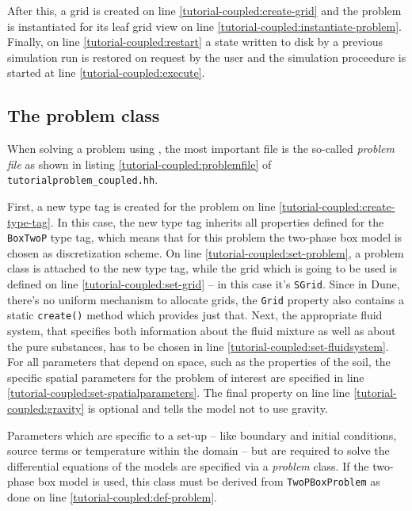 After this, a grid is created on line
\ref{tutorial-coupled:create-grid} and the problem is instantiated for
its leaf grid view on line \ref{tutorial-coupled:instantiate-problem}.
Finally, on line \ref{tutorial-coupled:restart} a state written to
disk by a previous simulation run is restored on request by the user
and the simulation proceedure is started at line
\ref{tutorial-coupled:execute}.

\subsection{The problem class}

When solving a problem using \Dumux, the most important file is the
so-called \textit{problem file} as shown in listing
\ref{tutorial-coupled:problemfile} of
\texttt{tutorialproblem\_coupled.hh}.

\begin{lst}\label{tutorial-coupled:problemfile} \mbox{}

\end{lst}

First, a new type tag is created for the problem on line
\ref{tutorial-coupled:create-type-tag}.  In this case, the new type
tag inherits all properties defined for the \texttt{BoxTwoP} type tag,
which means that for this problem the two-phase box model is chosen as
discretization scheme. On line \ref{tutorial-coupled:set-problem}, a
problem class is attached to the new type tag, while the grid which
is going to be used is defined on line \ref{tutorial-coupled:set-grid} --
in this case it's \texttt{SGrid}.  Since in Dune, there's no uniform
mechanism to allocate grids, the \texttt{Grid} property also contains
a static \texttt{create()} method which provides just that. Next,
the appropriate fluid system, that specifies both information about
the fluid mixture as well as about the pure substances, has to be chosen 
in line \ref{tutorial-coupled:set-fluidsystem}. For all parameters that 
depend on space, such as the properties of the soil, the specific spatial 
parameters for the problem of interest are specified in line
\ref{tutorial-coupled:set-spatialparameters}. The final property on line line
\ref{tutorial-coupled:gravity} is optional and tells the model not to
use gravity.

Parameters which are specific to a set-up -- like boundary and initial
conditions, source terms or temperature within the domain -- but are
required to solve the differential equations of the models are
specified via a \textit{problem} class. If the two-phase box model is
used, this class must be derived from \texttt{TwoPBoxProblem} as done
on line \ref{tutorial-coupled:def-problem}.

